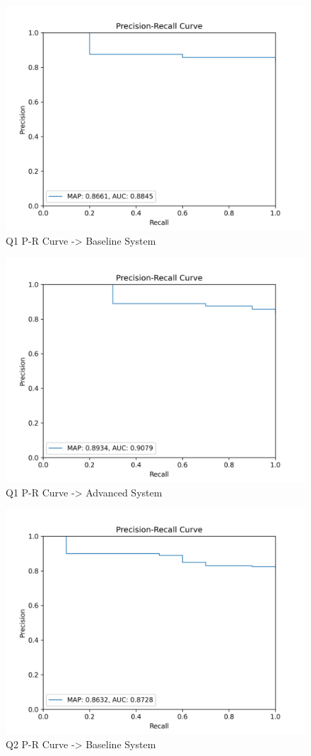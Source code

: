 \documentclass[sigconf]{acmart}
\begin{document}
\begin{figure}[H]
  \centering
  \includegraphics[width=0.8\linewidth]{precision_recall_q1b.png}
  \caption{Q1 P-R Curve -> Baseline System}
  \label{fig:precisionRecallBaseline1}
\end{figure}

\begin{figure}[H]
  \centering
  \includegraphics[width=0.8\linewidth]{precision_recall_q1a.png}
  \caption{Q1 P-R Curve -> Advanced System}
  \label{fig:precisionRecallAdvanced1}
\end{figure}

\begin{figure}[H]
  \centering
  \includegraphics[width=0.8\linewidth]{precision_recall_q2b.png}
  \caption{Q2 P-R Curve -> Baseline System}
  \label{fig:precisionRecallBaseline2}
\end{figure}
\end{document}
